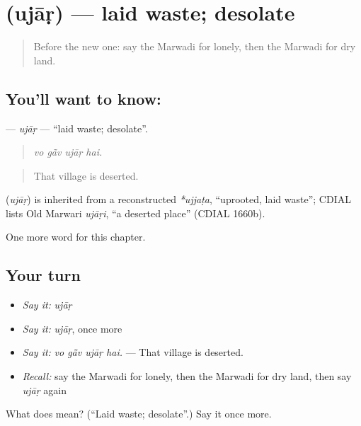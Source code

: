 \section[\texorpdfstring{\mw{उजाड़} (ujāṛ)}{उजाड़ (ujāṛ)}]{ (ujāṛ) — laid waste; desolate}

\label{lesson:MW-C226-ujar}



\begin{quote}
Before the new one: say the Marwadi for lonely, then the Marwadi for dry land.
\end{quote}

\subsection*{You'll want to know: }
\textbf{} — \emph{ujāṛ} — \textquotedblleft{}laid waste; desolate\textquotedblright{}.

\begin{quote}
   
\end{quote}

\begin{quote}
\emph{vo gā̃v ujāṛ hai.}
\end{quote}

\begin{quote}
That village is deserted.
\end{quote}

\begin{cousinweb}
\textbf{} (\emph{ujāṛ}) is inherited from a reconstructed \emph{*ujjaṭa}, \textquotedblleft{}uprooted, laid waste\textquotedblright{}; CDIAL lists Old Marwari \emph{ujāṛi}, \textquotedblleft{}a deserted place\textquotedblright{} (CDIAL 1660b).
\end{cousinweb}

\begin{grammarlens}[title={What you've built}]
One more word for this chapter.
\end{grammarlens}

\subsection*{Your turn}
\begin{itemize}
\raggedright
  \item \emph{Say it:} \emph{ujāṛ}
  \item \emph{Say it:} \emph{ujāṛ}, once more
  \item \emph{Say it:} \emph{vo gā̃v ujāṛ hai.} — That village is deserted.
  \item \emph{Recall:} say the Marwadi for lonely, then the Marwadi for dry land, then say \emph{ujāṛ} again
\end{itemize}

\begin{tcolorbox}[breakable,colback=teal!4,colframe=teal!35!black,title={Before you move on}]
What does  mean? (\textquotedblleft{}Laid waste; desolate\textquotedblright{}.) Say it once more.
\end{tcolorbox}

